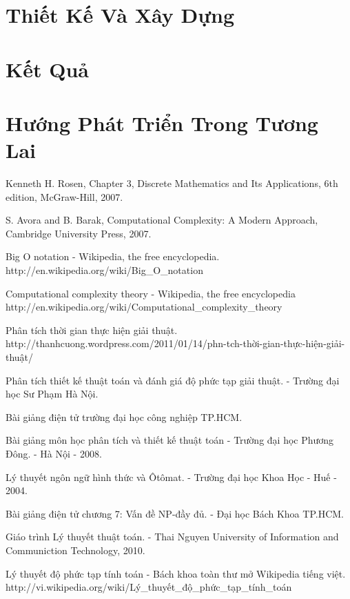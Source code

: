 \documentclass[14pt]{hcmutarticle}
\begin{document}
\chapter{Thiết Kế Và Xây Dựng}

\chapter{Kết Quả}

\chapter{Hướng Phát Triển Trong Tương Lai}


\newpage
\begin{thebibliography}{}
\bibitem{}
Kenneth H. Rosen, Chapter 3, Discrete Mathematics and Its Applications, 6th edition, McGraw-Hill, 2007.

\bibitem{}
S. Avora and B. Barak, Computational Complexity: A Modern Approach, Cambridge University Press, 2007.

\bibitem{}
Big O notation - Wikipedia, the free encyclopedia.
http://en.wikipedia.org/wiki/Big\_O\_notation

\bibitem{}
Computational complexity theory - Wikipedia, the free encyclopedia
http://en.wikipedia.org/wiki/Computational\_complexity\_theory

\bibitem{}
Phân tích thời gian thực hiện giải thuật.
http://thanhcuong.wordpress.com/2011/01/14/phn-tch-thời-gian-thực-hiện-giải-thuật/

Phân tích thiết kế thuật toán và đánh giá độ phức tạp giải thuật. - Trường đại học Sư Phạm Hà Nội.

\bibitem{}
Bài giảng điện tử trường đại học công nghiệp TP.HCM.

Bài giảng môn học phân tích và thiết kế thuật toán - Trường đại học Phương Đông. - Hà Nội - 2008.

\bibitem{}
Lý thuyết ngôn ngữ hình thức và Ôtômat. - Trường đại học Khoa Học - Huế - 2004.

\bibitem{}
Bài giảng điện tử chương 7: Vấn đề NP-đầy đủ. - Đại học Bách Khoa TP.HCM.

\bibitem{}
Giáo trình Lý thuyết thuật toán. - 
Thai Nguyen University of Information and Communiction Technology, 2010.

\bibitem{}
Lý thuyết độ phức tạp tính toán - Bách khoa toàn thư mở Wikipedia tiếng việt.
http://vi.wikipedia.org/wiki/Lý\_thuyết\_độ\_phức\_tạp\_tính\_toán


\end{thebibliography}
\end{document}
